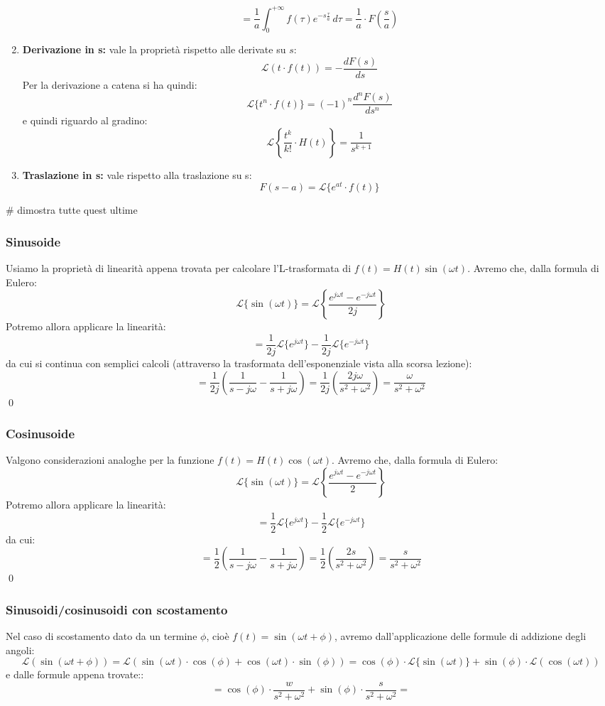 \documentclass[a4paper,11pt]{article}
\begin{document}
\begin{enumerate}
$$		$$
		$$
		= \frac{1}{a} \int_0^{+ \infty} f(\tau) e^{-s \frac{\tau}{a}} \, d\tau = \frac{1}{a} \cdot F\left( \frac{s}{a} \right)
		$$
	\item \textbf{Derivazione in s:} vale la proprietà rispetto alle derivate su $s$:
		$$
			\mathcal{L}(t \cdot f(t)) = - \frac{d F(s)}{ds}
		$$
		Per la derivazione a catena si ha quindi:
		$$
			\mathcal{L}\{t^n \cdot f(t)\} = (-1)^n \frac{d^n F(s)}{ds^n}
		$$
		e quindi riguardo al gradino:
		$$
		\mathcal{L}\left\{ \frac{t^k}{k!} \cdot H(t) \right\} = \frac{1}{s^{k + 1}}
		$$
	\item \textbf{Traslazione in s:} vale rispetto alla traslazione su s:
		$$
		F(s - a) = \mathcal{L}\{ e^{at}\cdot f(t) \}
		$$
\end{enumerate}

# dimostra tutte quest ultime

\subsubsection{Sinusoide}
Usiamo la proprietà di linearità appena trovata per calcolare l'L-trasformata di $f(t) = H(t)\sin(\omega t)$.
Avremo che, dalla formula di Eulero:
$$
\mathcal{L}\{\sin(\omega t)\} = \mathcal{L}\left\{ \frac{e^{j \omega t} - e^{- j \omega t}}{2j} \right\}
$$
Potremo allora applicare la linearità:
$$
= \frac{1}{2j} \mathcal{L}\{e^{j \omega t}\} - \frac{1}{2j} \mathcal{L}\{e^{-j \omega t}\}
$$
da cui si continua con semplici calcoli (attraverso la trasformata dell'esponenziale vista alla scorsa lezione):
$$
= \frac{1}{2j}\left( \frac{1}{s - j\omega} - \frac{1}{s + j \omega} \right) = \frac{1}{2j}\left( \frac{2j\omega}{s^2 + \omega^2} \right) = \frac{\omega}{s^2 + \omega^2}
$$ \qed

\subsubsection{Cosinusoide}
Valgono considerazioni analoghe per la funzione $f(t) = H(t) \cos(\omega t)$.
Avremo che, dalla formula di Eulero:
$$
\mathcal{L}\{\sin(\omega t)\} = \mathcal{L}\left\{ \frac{e^{j \omega t} - e^{- j \omega t}}{2} \right\}
$$
Potremo allora applicare la linearità:
$$
= \frac{1}{2} \mathcal{L}\{e^{j \omega t}\} - \frac{1}{2} \mathcal{L}\{e^{-j \omega t}\}
$$
da cui:
$$
= \frac{1}{2}\left( \frac{1}{s - j\omega} - \frac{1}{s + j \omega} \right) = \frac{1}{2}\left( \frac{2s}{s^2 + \omega^2} \right) = \frac{s}{s^2 + \omega^2}
$$ \qed

\subsubsection{Sinusoidi/cosinusoidi con scostamento}
Nel caso di scostamento dato da un termine $\phi$, cioè $f(t) = \sin(\omega t + \phi)$, avremo dall'applicazione delle formule di addizione degli angoli:
$$
\mathcal{L}(\sin(\omega t + \phi)) = \mathcal{L}( \sin(\omega t) \cdot \cos(\phi) + \cos(\omega t) \cdot \sin(\phi) ) = \cos(\phi) \cdot \mathcal{L} \{ \sin(\omega t) \} + \sin(\phi) \cdot \mathcal{L}(\cos (\omega t))
$$
e dalle formule appena trovate::
$$
= \cos(\phi) \cdot \frac{w}{s^2 + \omega ^2} + \sin(\phi) \cdot \frac{s}{s^2 + \omega ^2} = 
$$
\end{document}
